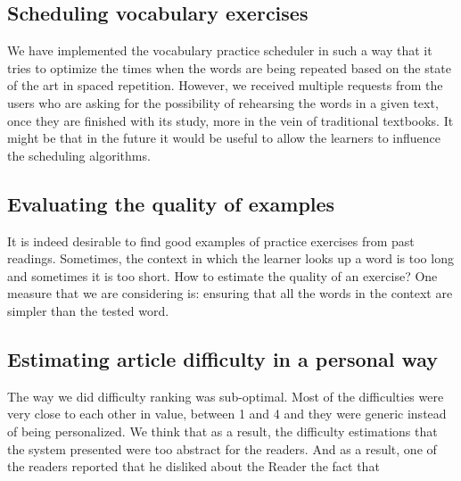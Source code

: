 \subsection{Scheduling vocabulary exercises}
We have implemented the vocabulary practice scheduler in such a way that it tries to optimize the times when the words are being repeated based on the state of the art in spaced repetition. However, we received multiple requests from the users who are asking for the possibility of rehearsing the words in a given text, once they are finished with its study, more in the vein of traditional textbooks. It might be that in the future it would be useful to allow the learners to influence the scheduling algorithms. 



\subsection{Evaluating the quality of examples}

It is indeed desirable to find good examples of practice exercises from past readings. Sometimes, the context in which the learner looks up a word is too long and sometimes it is too short. How to estimate the quality of an exercise? One measure that we are considering is: ensuring that all the words in the context are simpler than the tested word. 


\subsection{Estimating article difficulty in a personal way}
The way we did difficulty ranking was sub-optimal. Most of the difficulties were very close to each other in value, between 1 and 4 and they were generic instead of being personalized. We think that as a result, the difficulty estimations that the system presented were too abstract for the readers. And as a result, one of the readers reported that he disliked about the Reader the fact that  

